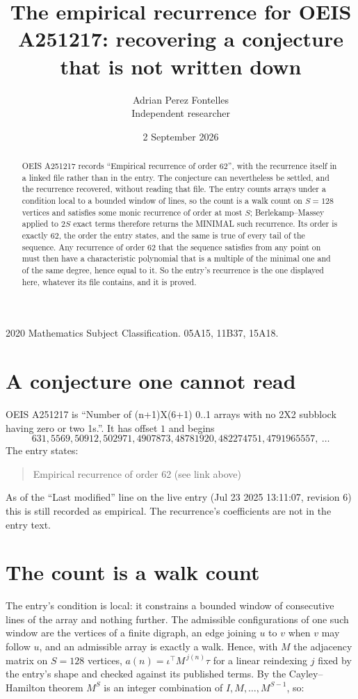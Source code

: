 \documentclass[11pt,a4paper]{article}
\title{The empirical recurrence for OEIS A251217: recovering a conjecture that is not written down}
\author{Adrian Perez Fontelles\\ \small Independent researcher}
\date{2 September 2026}
\theoremstyle{plain}
\theoremstyle{definition}
\begin{document}
\maketitle

\begin{abstract}
OEIS A251217 records ``Empirical recurrence of order $62$'', with the recurrence itself in a
linked file rather than in the entry. The conjecture can nevertheless be settled, and the
recurrence recovered, without reading that file. The entry counts arrays under a condition
local to a bounded window of lines, so the count is a walk count on $S=128$ vertices and
satisfies some monic recurrence of order at most $S$; Berlekamp--Massey applied to $2S$ exact
terms therefore returns the MINIMAL such recurrence. Its order is exactly $62$, the order
the entry states, and the same is true of every tail of the sequence. Any recurrence of order
$62$ that the sequence satisfies from any point on must then have a characteristic
polynomial that is a multiple of the minimal one and of the same degree, hence equal to it. So
the entry's recurrence is the one displayed here, whatever its file contains, and it is
proved.
\end{abstract}

\noindent\small 2020 Mathematics Subject Classification. 05A15, 11B37, 15A18.\normalsize

\section{A conjecture one cannot read}

OEIS A251217 is ``Number of (n+1)X(6+1) 0..1 arrays with no 2X2 subblock having zero or two 1s.''. It has offset $1$ and begins
\[
631, 5569, 50912, 502971, 4907873, 48781920, 482274751, 4791965557,\ \dots
\]
The entry states:
\begin{quote}
Empirical recurrence of order 62 (see link above)
\end{quote}
As of the ``Last modified'' line on the live entry (Jul 23 2025 13:11:07, revision 6) this is still
recorded as empirical. The recurrence's coefficients are not in the entry text.

\section{The count is a walk count}

The entry's condition is local: it constrains a bounded window of consecutive lines of the
array and nothing further. The admissible configurations of one such window are the vertices
of a finite digraph, an edge joining $u$ to $v$ when $v$ may follow $u$, and an admissible
array is exactly a walk. Hence, with $M$ the adjacency matrix on $S=128$ vertices,
$a(n)=\iota^{\!\top}M^{\,j(n)}\tau$ for a linear reindexing $j$ fixed by the entry's shape
and checked against its published terms. By the Cayley--Hamilton theorem $M^{S}$ is an
integer combination of $I,M,\dots,M^{S-1}$, so:
\end{document}
